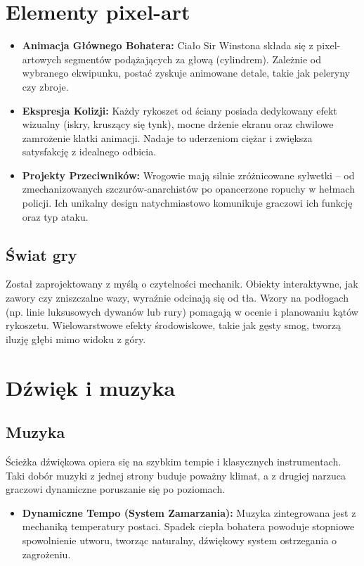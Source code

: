 \documentclass[12pt, letterpaper,Titlepage]{article}
\begin{document}
\section{Elementy pixel-art}
\begin{itemize}
\item \textbf{Animacja Głównego Bohatera:} Ciało Sir Winstona składa się z pixel-artowych segmentów podążających za głową (cylindrem). Zależnie od wybranego ekwipunku, postać zyskuje animowane detale, takie jak peleryny czy zbroje.
\item \textbf{Ekspresja Kolizji:} Każdy rykoszet od ściany posiada dedykowany efekt wizualny (iskry, kruszący się tynk), mocne drżenie ekranu oraz chwilowe zamrożenie klatki animacji. Nadaje to uderzeniom ciężar i zwiększa satysfakcję z idealnego odbicia.
\item \textbf{Projekty Przeciwników:} Wrogowie mają silnie zróżnicowane sylwetki – od zmechanizowanych szczurów-anarchistów po opancerzone ropuchy w hełmach policji. Ich unikalny design natychmiastowo komunikuje graczowi ich funkcję oraz typ ataku.
\end{itemize}

\subsection{Świat gry}
Został zaprojektowany z myślą o czytelności mechanik. Obiekty interaktywne, jak zawory czy zniszczalne wazy, wyraźnie odcinają się od tła. Wzory na podłogach (np. linie luksusowych dywanów lub rury) pomagają w ocenie i planowaniu kątów rykoszetu. Wielowarstwowe efekty środowiskowe, takie jak gęsty smog, tworzą iluzję głębi mimo widoku z góry.

\section{Dźwięk i muzyka}
\subsection{Muzyka}
Ścieżka dźwiękowa opiera się na szybkim tempie i klasycznych instrumentach. Taki dobór muzyki z jednej strony buduje poważny klimat, a z drugiej narzuca graczowi dynamiczne poruszanie się po poziomach.

\begin{itemize}
    \item \textbf{Dynamiczne Tempo (System Zamarzania):} Muzyka zintegrowana jest z mechaniką temperatury postaci. Spadek ciepła bohatera powoduje stopniowe spowolnienie utworu, tworząc naturalny, dźwiękowy system ostrzegania o zagrożeniu.
\end{itemize}
\end{document}
